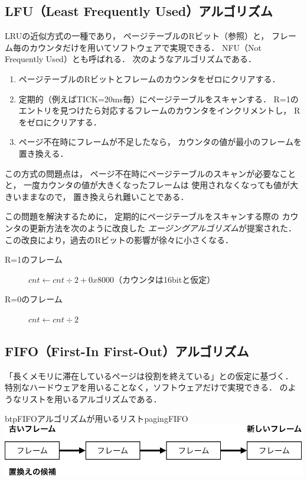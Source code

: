 \subsection{LFU（Least Frequently Used）アルゴリズム}
LRUの近似方式の一種であり，
ページテーブルのRビット（参照）と，
フレーム毎のカウンタだけを用いてソフトウェアで実現できる．
NFU（Not Frequently Used）とも呼ばれる．
次のようなアルゴリズムである．

\begin{enumerate}
\item ページテーブルのRビットとフレームのカウンタをゼロにクリアする．
\item 定期的（例えばTICK=20ms毎）にページテーブルをスキャンする．
  R=1のエントリを見つけたら対応するフレームのカウンタをインクリメントし，
  Rをゼロにクリアする．
\item ページ不在時にフレームが不足したなら，
  カウンタの値が最小のフレームを置き換える．
\end{enumerate}

この方式の問題点は，
ページ不在時にページテーブルのスキャンが必要なことと，
一度カウンタの値が大きくなったフレームは
使用されなくなっても値が大きいままなので，
置き換えられ難いことである．

この問題を解決するために，
定期的にページテーブルをスキャンする際の
カウンタの更新方法を次のように改良した
\emph{エージングアルゴリズム}が提案された．
この改良により，過去のRビットの影響が徐々に小さくなる．

\begin{description}
\item[R=1のフレーム]
  $cnt \leftarrow cnt \div 2 + 0x8000$（カウンタは16bitと仮定）
\item[R=0のフレーム]
$cnt \leftarrow cnt \div 2$
\end{description}

\subsection{FIFO（First-In First-Out）アルゴリズム}
「長くメモリに滞在しているページは役割を終えている」との仮定に基づく．
特別なハードウェアを用いることなく，ソフトウェアだけで実現できる．
のようなリストを用いるアルゴリズムである．

\begin{myfig}{btp}{FIFOアルゴリズムが用いるリスト}{pagingFIFO}
  \includegraphics[scale=0.66]{Fig/pagingFIFO-crop.pdf}
\end{myfig}


